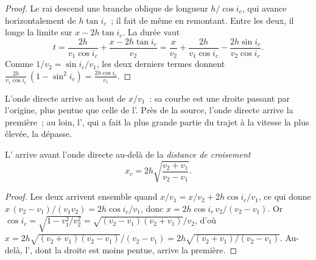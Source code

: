 \begin{proof}
Le rai descend une branche oblique de longueur $h/\cos i_c$, qui avance
horizontalement de $h\tan i_c$~; il fait de même en remontant. Entre les
deux, il longe la limite sur $x - 2h\tan i_c$. La durée vaut
\[
  t = \frac{2h}{v_1\cos i_c} + \frac{x - 2h\tan i_c}{v_2}
    = \frac{x}{v_2} + \frac{2h}{v_1\cos i_c} - \frac{2h\sin i_c}{v_2\cos i_c}.
\]
Comme $1/v_2 = \sin i_c/v_1$, les deux derniers termes donnent
$\frac{2h}{v_1\cos i_c}\,(1 - \sin^2 i_c) = \frac{2h\cos i_c}{v_1}$.
\end{proof}

L'onde directe arrive au bout de $x/v_1$~: sa courbe est une droite passant
par l'origine, plus pentue que celle de l'. Près de la source,
l'onde directe arrive la première~; au loin, l', qui a fait la
plus grande partie du trajet à la vitesse la plus élevée, la dépasse.

\begin{proposition}\label{prop:g11:seismic-structure:crossover}
L' arrive avant l'onde directe au-delà de la \emph{distance de
croisement}
\[
  x_c = 2h\sqrt{\frac{v_2 + v_1}{v_2 - v_1}}.
\]
\end{proposition}

\begin{proof}
Les deux arrivent ensemble quand $x/v_1 = x/v_2 + 2h\cos i_c/v_1$, ce qui donne
$x\,(v_2 - v_1)/(v_1 v_2) = 2h\cos i_c/v_1$, donc $x = 2h\cos i_c\,v_2/(v_2 -
v_1)$. Or $\cos i_c = \sqrt{1 - v_1^2/v_2^2} = \sqrt{(v_2 - v_1)(v_2 +
v_1)}/v_2$, d'où $x = 2h\sqrt{(v_2 + v_1)(v_2 - v_1)}/(v_2 - v_1) =
2h\sqrt{(v_2 + v_1)/(v_2 - v_1)}$. Au-delà, l', dont la droite
est moins pentue, arrive la première.
\end{proof}

